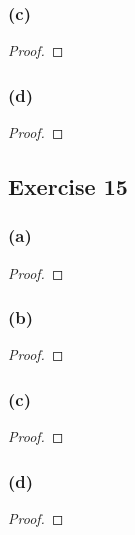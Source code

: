 \documentclass[14pt]{extarticle}
\begin{document}
\subsubsection{(c)}

\begin{proof}

\end{proof}

\subsubsection{(d)}

\begin{proof}

\end{proof}

\subsection{Exercise 15}

\subsubsection{(a)}

\begin{proof}

\end{proof}

\subsubsection{(b)}

\begin{proof}

\end{proof}

\subsubsection{(c)}

\begin{proof}

\end{proof}

\subsubsection{(d)}

\begin{proof}

\end{proof}
\end{document}
